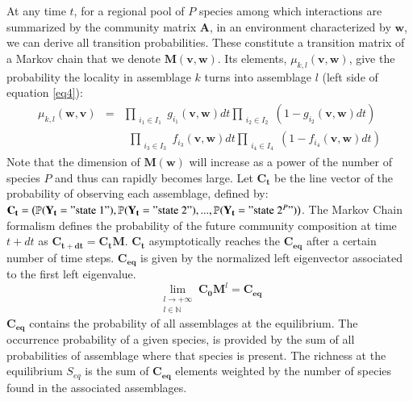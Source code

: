 At any time $t$, for a regional pool of $P$ species among which interactions are summarized by the community matrix $\mathbf{A}$, in an environment characterized by $\mathbf{w}$, we can derive all transition probabilities. These constitute a transition matrix of a Markov chain that we denote $\mathbf{M}(\mathbf{v,w})$. Its elements, $\mu_{k,l}(\mathbf{v,w})$, give the probability the locality in assemblage $k$ turns into assemblage $l$ (left side of equation \eqref{eq4}):
\begin{eqnarray}
\nonumber \mu_{k,l}(\mathbf{w,v}) &=& \prod_{\substack{i_1\in I_1}}g_{i_1}(\mathbf{v}, \mathbf{w})dt \prod_{\substack{i_2\in I_2}}(1-g_{i_2}(\mathbf{v}, \mathbf{w})dt) \\
\label{eq6} & & ~~ \prod_{\substack{i_3\in I_3}}f_{i_3}(\mathbf{v}, \mathbf{w})dt \prod_{\substack{i_4\in I_4}}(1-f_{i_4}(\mathbf{v}, \mathbf{w})dt)
\end{eqnarray}
Note that the dimension of $\mathbf{M}(\mathbf{w})$ will increase as a power of the number of species $P$ and thus can rapidly becomes large. Let $\mathbf{C_t}$ be the line vector of the probability of observing each assemblage, defined by: $\mathbf{C_t}=\big(\mathbb{P}(\mathbf{Y_t}="\text{state }1"), \mathbb{P}(\mathbf{Y_t}="\text{state }2"),..., \mathbb{P}(\mathbf{Y_t}="\text{state }2^P")\big)$. The Markov Chain formalism defines the probability of the future community composition at time $t+dt$ as $ \mathbf{C_{t+dt}}=\mathbf{C_t}\mathbf{M}$. $\mathbf{C_t}$ asymptotically reaches the $\mathbf{C_{eq}}$ after a certain number of time steps. $\mathbf{C_{eq}}$ is given by the normalized left eigenvector associated to the first left eigenvalue.
\begin{equation}
\label{eq7}
\lim\limits_{\substack{l \to +\infty \\ l \in \mathbb{N}}} \mathbf{C_0}\mathbf{M}^l=\mathbf{C_{eq}}
\end{equation}
$\mathbf{C_{eq}}$ contains the probability of all assemblages at the equilibrium. The occurrence probability of a given species, is provided by the sum of all probabilities of assemblage where that species is present. The richness at the equilibrium $S_{eq}$ is the sum of $\mathbf{C_{eq}}$ elements weighted by the number of species found in the associated assemblages.

